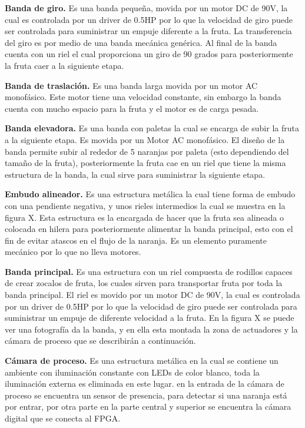 \documentclass[twoside,spanish,ESP,MSc]{plantillaLabUPV}
\theoremstyle{definition}
\begin{document}

\checkmark\textbf{Banda de giro.} Es una banda pequeña, movida por un motor DC de 90V, la cual es controlada por un driver de 0.5HP por lo que la velocidad de giro puede ser controlada para suministrar un empuje diferente a la fruta. La transferencia del giro es por medio de una banda mecánica genérica. Al final de la banda cuenta con un riel el cual proporciona un giro de 90 grados para posteriormente la fruta caer a la siguiente etapa.



\checkmark\textbf{Banda de traslación.} Es una banda larga movida por un motor AC monofásico. Este motor tiene una velocidad constante, sin embargo la banda cuenta con mucho espacio para la fruta y el motor es de carga pesada.



\checkmark\textbf{Banda elevadora.} Es una banda con paletas la cual se encarga de subir la fruta a la siguiente etapa. Es movida por un Motor AC monofásico. El diseño de la banda permite subir al rededor de 5 naranjas por paleta (esto dependiendo del tamaño de la fruta), posteriormente la fruta cae en un riel que tiene la misma estructura de la banda, la cual sirve para suministrar la siguiente etapa.



\checkmark\textbf{Embudo alineador.} Es una estructura metálica la cual tiene forma de embudo con una pendiente negativa, y unos rieles intermedios la cual se muestra en la figura X. Esta estructura es la encargada de hacer que la fruta sea alineada o colocada en hilera para posteriormente alimentar la banda principal, esto con el fin de evitar atascos en el flujo de la naranja. Es un elemento puramente mecánico por lo que no lleva motores.



\checkmark\textbf{Banda principal.} Es una estructura con un riel compuesta de rodillos capaces de crear zocalos de fruta, los cuales sirven para transportar fruta por toda la banda principal. El riel es movido por un motor DC de 90V, la cual es controlada por un driver de 0.5HP por lo que la velocidad de giro puede ser controlada para suministrar un empuje de diferente velocidad a la fruta. En la figura X se puede ver una fotografía da la banda, y en ella esta montada la zona de actuadores y la cámara de proceso que se describirán a continuación.



\checkmark\textbf{Cámara de proceso.} Es una estructura metálica en la cual se contiene un ambiente con iluminación constante con LEDs de color blanco, toda la iluminación externa es eliminada en este lugar. en la entrada de la cámara de proceso se encuentra un sensor de presencia, para detectar si una naranja está por entrar, por otra parte en la parte central y superior se encuentra la cámara digital que se conecta al FPGA.
\end{document}
